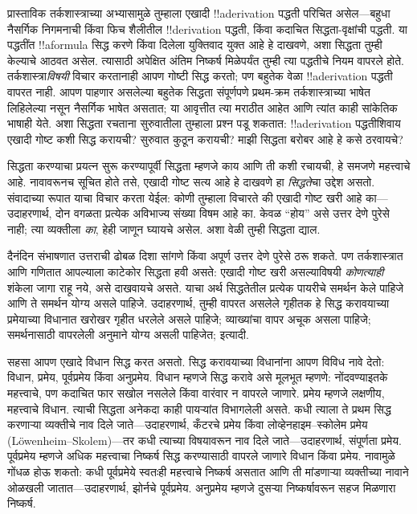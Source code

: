\documentclass[../../../include/open-logic-section]{subfiles}
\begin{document}


प्रास्ताविक तर्कशास्त्राच्या अभ्यासामुळे तुम्हाला एखादी !!a{derivation} पद्धती परिचित असेल---बहुधा नैसर्गिक निगमनाची किंवा फिच शैलीतील !!{derivation} पद्धती, किंवा कदाचित सिद्धता-वृक्षांची पद्धती. या पद्धतींत !!a{formula} सिद्ध करणे किंवा दिलेला युक्तिवाद युक्त आहे हे दाखवणे, अशा सिद्धता तुम्ही केल्याचे आठवत असेल. त्यासाठी अपेक्षित अंतिम निष्कर्ष मिळेपर्यंत तुम्ही त्या पद्धतीचे नियम वापरले होते. तर्कशास्त्रा\emph{विषयी} विचार करतानाही आपण गोष्टी सिद्ध करतो; पण बहुतेक वेळा !!a{derivation} पद्धती वापरत नाही. आपण पाहणार असलेल्या बहुतेक सिद्धता संपूर्णपणे प्रथम-क्रम तर्कशास्त्राच्या भाषेत लिहिलेल्या नसून नैसर्गिक भाषेत असतात; या आवृत्तीत त्या मराठीत आहेत आणि त्यांत काही सांकेतिक भाषाही येते. अशा सिद्धता रचताना सुरुवातीला तुम्हाला प्रश्न पडू शकतात: !!a{derivation} पद्धतीशिवाय एखादी गोष्ट कशी सिद्ध करायची? सुरुवात कुठून करायची? माझी सिद्धता बरोबर आहे हे कसे ठरवायचे?

सिद्धता करण्याचा प्रयत्न सुरू करण्यापूर्वी सिद्धता म्हणजे काय आणि ती कशी रचायची, हे समजणे महत्त्वाचे आहे. नावावरूनच सूचित होते तसे, एखादी गोष्ट सत्य आहे हे दाखवणे हा \emph{सिद्धते}चा उद्देश असतो. संवादाच्या रूपात याचा विचार करता येईल: कोणी तुम्हाला विचारते की एखादी गोष्ट खरी आहे का---उदाहरणार्थ, दोन वगळता प्रत्येक अविभाज्य संख्या विषम आहे का. केवळ “होय” असे उत्तर देणे पुरेसे नाही; त्या व्यक्तीला \emph{का}, हेही जाणून घ्यायचे असेल. अशा वेळी तुम्ही सिद्धता द्याल.

दैनंदिन संभाषणात उत्तराची ढोबळ दिशा सांगणे किंवा अपूर्ण उत्तर देणे पुरेसे ठरू शकते. पण तर्कशास्त्रात आणि गणितात आपल्याला काटेकोर सिद्धता हवी असते: एखादी गोष्ट खरी असल्याविषयी \emph{कोणत्याही} शंकेला जागा राहू नये, असे दाखवायचे असते. याचा अर्थ सिद्धतेतील प्रत्येक पायरीचे समर्थन केले पाहिजे आणि ते समर्थन योग्य असले पाहिजे. उदाहरणार्थ, तुम्ही वापरत असलेले गृहीतक हे सिद्ध करावयाच्या प्रमेयाच्या विधानात खरोखर गृहीत धरलेले असले पाहिजे; व्याख्यांचा वापर अचूक असला पाहिजे; समर्थनासाठी वापरलेली अनुमाने योग्य असली पाहिजेत; इत्यादी.

सहसा आपण एखादे विधान सिद्ध करत असतो. सिद्ध करावयाच्या विधानांना आपण विविध नावे देतो: विधान, प्रमेय, पूर्वप्रमेय किंवा अनुप्रमेय. विधान म्हणजे सिद्ध करावे असे मूलभूत म्हणणे: नोंदवण्याइतके महत्त्वाचे, पण कदाचित फार सखोल नसलेले किंवा वारंवार न वापरले जाणारे. प्रमेय म्हणजे लक्षणीय, महत्त्वाचे विधान. त्याची सिद्धता अनेकदा काही पायऱ्यांत विभागलेली असते. कधी त्याला ते प्रथम सिद्ध करणाऱ्या व्यक्तीचे नाव दिले जाते---उदाहरणार्थ, कँटरचे प्रमेय किंवा लोव्हेनहाइम--स्कोलेम प्रमेय (L\"owenheim--Skolem)---तर कधी त्याच्या विषयावरून नाव दिले जाते---उदाहरणार्थ, संपूर्णता प्रमेय. पूर्वप्रमेय म्हणजे अधिक महत्त्वाचा निष्कर्ष सिद्ध करण्यासाठी वापरले जाणारे विधान किंवा प्रमेय. नावामुळे गोंधळ होऊ शकतो: कधी पूर्वप्रमेये स्वतःही महत्त्वाचे निष्कर्ष असतात आणि ती मांडणाऱ्या व्यक्तीच्या नावाने ओळखली जातात---उदाहरणार्थ, झोर्नचे पूर्वप्रमेय. अनुप्रमेय म्हणजे दुसऱ्या निष्कर्षावरून सहज मिळणारा निष्कर्ष.
\end{document}

